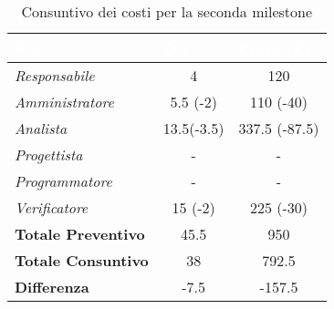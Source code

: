\begin{table}[H]
    \renewcommand\arraystretch{1.5}
    \centering
    \begin{tabular}{|l|c|c|}
    \hline
    \rowcolor[HTML]{036400}
    \textcolor{white}{\textbf{Ruolo}} & \multicolumn{1}{l|}{\textcolor{white}{\textbf{Ore}}} & \multicolumn{1}{l|}{\textcolor{white}{\textbf{Costo (€)}}} \\ \hline
    \rowcolor[HTML]{EFEFEF}\textit{Responsabile}      & 4         & 120         \\ \hline
    \rowcolor[HTML]{C0C0C0}\textit{Amministratore}    & 5.5 (-2)  & 110 (-40)   \\ \hline
    \rowcolor[HTML]{EFEFEF}\textit{Analista}          & 13.5(-3.5)  & 337.5 (-87.5) \\ \hline
    \rowcolor[HTML]{C0C0C0}\textit{Progettista}       & -         & -           \\ \hline
    \rowcolor[HTML]{EFEFEF}\textit{Programmatore}     & -         & -           \\ \hline
    \rowcolor[HTML]{C0C0C0}\textit{Verificatore}      & 15 (-2)   & 225 (-30)   \\ \hline
    \rowcolor[HTML]{EFEFEF}\textbf{Totale Preventivo} & 45.5      & 950         \\ \hline
    \rowcolor[HTML]{C0C0C0}\textbf{Totale Consuntivo} & 38        & 792.5       \\ \hline
    \rowcolor[HTML]{EFEFEF}\textbf{Differenza}        & -7.5      & -157.5      \\ \hline
    \end{tabular}
    \caption{Consuntivo dei costi per la seconda milestone}
\end{table}


